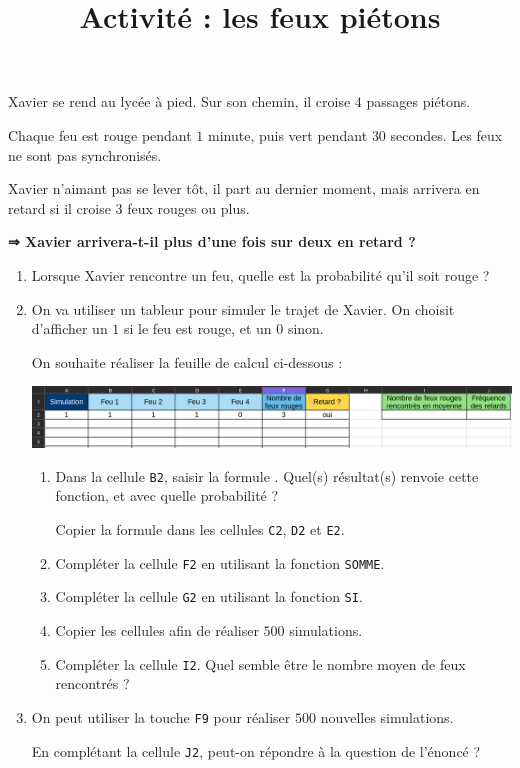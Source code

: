 \documentclass[
	classe=$1^{ere}STI2D$
]{informatique}
\title{Activité : les feux piétons}
\begin{document}
\maketitle
{}

\begin{tcolorbox}
	Xavier se rend au lycée à pied. Sur son chemin, il croise $4$ passages piétons.

	Chaque feu est rouge pendant $1$ minute, puis vert pendant $30$ secondes. Les feux ne sont pas synchronisés.

	Xavier n'aimant pas se lever tôt, il part au dernier moment, mais arrivera en retard si il croise $3$ feux rouges ou plus.

	\textbf{⇒ Xavier arrivera-t-il plus d'une fois sur deux en retard ?}
\end{tcolorbox}

\begin{enumerate}
	\item Lorsque Xavier rencontre un feu, quelle est la probabilité qu'il soit rouge ?
	\item On va utiliser un tableur pour simuler le trajet de Xavier. On choisit d'afficher un $1$ si le feu est rouge, et un $0$ sinon.

	      On souhaite réaliser la feuille de calcul ci-dessous :

	      \begin{center}
		      \includegraphics[width=0.9\linewidth]{Images/Tableur feux rouges.png}
	      \end{center}

	      \begin{enumerate}
		      \item Dans la cellule \texttt{B2}, saisir la formule . Quel(s) résultat(s) renvoie cette fonction, et avec quelle probabilité ? 

		            Copier la formule dans les cellules \texttt{C2}, \texttt{D2} et \texttt{E2}.
		      \item Compléter la cellule \texttt{F2} en utilisant la fonction \texttt{SOMME}.
		      \item Compléter la cellule \texttt{G2} en utilisant la fonction \texttt{SI}.
		      \item Copier les cellules afin de réaliser $500$ simulations.
		      \item Compléter la cellule \texttt{I2}. Quel semble être le nombre moyen de feux rencontrés ? 
	      \end{enumerate}
	\item On peut utiliser la touche \texttt{F9} pour réaliser $500$ nouvelles simulations.

	      En complétant la cellule \texttt{J2}, peut-on répondre à la question de l'énoncé ?
\end{enumerate}
\end{document}
